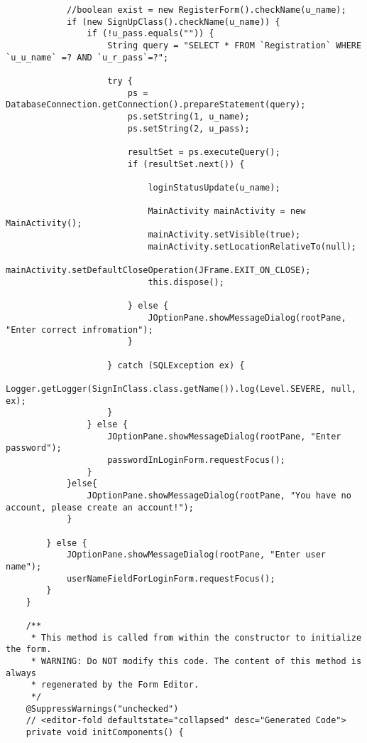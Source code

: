 \documentclass[12pt,a4paper]{article}
\begin{document}
\begin{lstlisting}
            //boolean exist = new RegisterForm().checkName(u_name);
            if (new SignUpClass().checkName(u_name)) {
                if (!u_pass.equals("")) {
                    String query = "SELECT * FROM `Registration` WHERE `u_u_name` =? AND `u_r_pass`=?";

                    try {
                        ps = DatabaseConnection.getConnection().prepareStatement(query);
                        ps.setString(1, u_name);
                        ps.setString(2, u_pass);

                        resultSet = ps.executeQuery();
                        if (resultSet.next()) {
                            
                            loginStatusUpdate(u_name);
                            
                            MainActivity mainActivity = new MainActivity();
                            mainActivity.setVisible(true);
                            mainActivity.setLocationRelativeTo(null);
                            mainActivity.setDefaultCloseOperation(JFrame.EXIT_ON_CLOSE);
                            this.dispose();
                            
                        } else {
                            JOptionPane.showMessageDialog(rootPane, "Enter correct infromation");
                        }

                    } catch (SQLException ex) {
                        Logger.getLogger(SignInClass.class.getName()).log(Level.SEVERE, null, ex);
                    }
                } else {
                    JOptionPane.showMessageDialog(rootPane, "Enter password");
                    passwordInLoginForm.requestFocus();
                }
            }else{
                JOptionPane.showMessageDialog(rootPane, "You have no account, please create an account!");
            }

        } else {
            JOptionPane.showMessageDialog(rootPane, "Enter user name");
            userNameFieldForLoginForm.requestFocus();
        }
    }

    /**
     * This method is called from within the constructor to initialize the form.
     * WARNING: Do NOT modify this code. The content of this method is always
     * regenerated by the Form Editor.
     */
    @SuppressWarnings("unchecked")
    // <editor-fold defaultstate="collapsed" desc="Generated Code">                          
    private void initComponents() {


\end{lstlisting}
\end{document}
